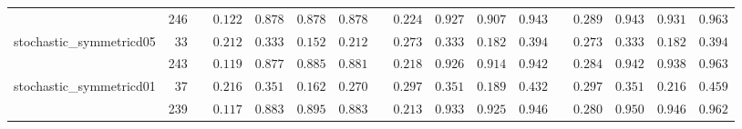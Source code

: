 \begin{longtable}{lr>{\raggedleft\arraybackslash}p{20px}rrrr>{\raggedleft\arraybackslash}p{20px}rrrr>{\raggedleft\arraybackslash}p{20px}rrrr}
 & 246 &  & $0.122$ & $0.878$ & $0.878$ & $0.878$ &  & $0.224$ & $0.927$ & $0.907$ & $0.943$ &  & $0.289$ & $0.943$ & $0.931$ & $0.963$ \\ 
stochastic\_symmetricd05 & 33 &  & $0.212$ & \textbf{$0.333$} & $0.152$ & $0.212$ &  & $0.273$ & \textbf{$0.333$} & $0.182$ & $0.394$ &  & $0.273$ & \textbf{$0.333$} & $0.182$ & $0.394$ \\ 
 & 243 &  & $0.119$ & $0.877$ & $0.885$ & $0.881$ &  & $0.218$ & $0.926$ & $0.914$ & $0.942$ &  & $0.284$ & $0.942$ & $0.938$ & $0.963$ \\ 
stochastic\_symmetricd01 & 37 &  & $0.216$ & \textbf{$0.351$} & $0.162$ & $0.270$ &  & $0.297$ & \textbf{$0.351$} & $0.189$ & $0.432$ &  & $0.297$ & \textbf{$0.351$} & $0.216$ & $0.459$ \\ 
 & 239 &  & $0.117$ & $0.883$ & $0.895$ & $0.883$ &  & $0.213$ & $0.933$ & $0.925$ & $0.946$ &  & $0.280$ & $0.950$ & $0.946$ & $0.962$ \\ 
\bottomrule
\end{longtable}

